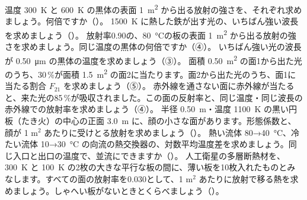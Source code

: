 \bkendproblems
{}
\bkproblem 温度 \qty{300}{K} と \qty{600}{K} の黒体の表面 \qty{1}{m^2} から出る放射の強さを、それぞれ求めましょう。何倍ですか（\nobreak{}\nobreak）。
\bkproblem \qty{1500}{K} に熱した鉄が出す光の、いちばん強い波長を求めましょう（\nobreak{}\nobreak）。
\bkproblem 放射率0.90の、\qty{80}{\celsius}の板の表面 \qty{1}{m^2} から出る放射の強さを求めましょう。同じ温度の黒体の何倍ですか（④）。
\bkproblem いちばん強い光の波長が \qty{0.50}{\micro m} の黒体の温度を求めましょう（③）。
\bkproblem 面積 \qty{0.50}{m^2} の面1から出た光のうち、30\,\%が面積 \qty{1.5}{m^2} の面2に当たります。面2から出た光のうち、面1に当たる割合 $F_{21}$ を求めましょう（⑤）。
\bkproblem 赤外線を通さない面に赤外線が当たると、来た光の85\,\%が吸収されました。この面の反射率と、同じ温度・同じ波長の赤外線での放射率を求めましょう（④）。
\bkproblem 半径 \qty{0.50}{m}・温度 \qty{1100}{K} の黒い円板（たき火）の中心の正面 \qty{3.0}{m} に、顔の小さな面があります。形態係数と、顔が 1 m$^2$ あたりに受けとる放射を求めましょう（）。
\bkproblem 熱い流体 80→\qty{40}{\celsius}、冷たい流体 10→\qty{30}{\celsius} の向流の熱交換器の、対数平均温度差を求めましょう。同じ入口と出口の温度で、並流にできますか（）。
\bkproblem 人工衛星の多層断熱材を、\qty{300}{K} と \qty{100}{K} の2枚の大きな平行な板の間に、薄い板を10枚入れたものとみなします。すべての面の放射率を0.030として、1 m$^2$ あたりに放射で移る熱を求めましょう。しゃへい板がないときとくらべましょう（\nobreak{}\nobreak）。
